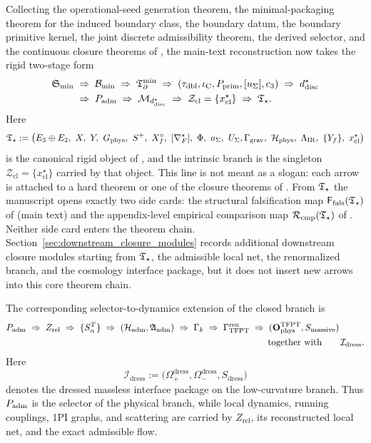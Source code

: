Collecting the operational-seed generation theorem, the minimal-packaging theorem for the induced
boundary class, the boundary datum, the
boundary primitive kernel, the joint discrete admissibility theorem, the derived selector, and the continuous closure
theorems of
, the main-text reconstruction now takes the rigid two-stage form
\begin{equation}
\label{eq:closed-output-chain}
\begin{aligned}
\mathfrak S_{\min}
&\;\Rightarrow\;
\mathcal B_{\min}
\;\Rightarrow\;
\mathfrak T_{\partial}^{\min}
\;\Rightarrow\;
(\tau_{\mathrm{dbl}},\iota_{\mathrm C},P_{\mathrm{prim}},[u_\Sigma],c_3)
\;\Rightarrow\;
d^\star_{\mathrm{disc}}
\\
&\;\Rightarrow\;
P_{\mathrm{adm}}
\;\Rightarrow\;
\mathcal M_{d^\star_{\mathrm{disc}}}
\;\Rightarrow\;
\mathcal Z_{\mathrm{cl}}=\{x^\star_{\mathrm{cl}}\}
\;\Rightarrow\;
\mathfrak T_{\star}.
\end{aligned}
\end{equation}
Here
\[
\Tstar
:=
\bigl(
E_3\oplus E_2,\ X,\ Y,\ G_{\mathrm{phys}},\ S^+,\ X_f^\circ,\ [\nabla_F^\star],\ \Phi,\ a_\Sigma,\ U_\Sigma,\\
\Gamma_{\mathrm{grav}},\ \mathcal H_{\mathrm{phys}},\ \Lambda_{\mathrm{IR}},\ \{Y_f\},\ x_{\mathrm{cl}}^\star
\bigr)
\]
is the canonical rigid object of , and the intrinsic branch is
the singleton $\mathcal Z_{\mathrm{cl}}=\{x_{\mathrm{cl}}^\star\}$ carried by that object.
This line is not meant as a slogan: each arrow is attached to a hard theorem or one of the
closure theorems of . From $\mathfrak T_{\star}$ the manuscript opens exactly two
side cards: the structural falsification map $\mathsf F_{\mathrm{fals}}(\mathfrak T_{\star})$ of
 (main text) and the appendix-level empirical comparison
map $\mathcal R_{\mathrm{cmp}}(\mathfrak T_{\star})$ of . Neither side card enters the
theorem chain.
Section~\ref{sec:downstream_closure_modules} records additional downstream closure modules starting
from $\mathfrak T_{\star}$, the admissible local net, the renormalized branch, and the cosmology interface
package, but it does not insert new arrows into this core theorem chain.

The corresponding selector-to-dynamics extension of the closed branch is
\[
P_{\mathrm{adm}}
\;\Rightarrow\;
Z_{\mathrm{rel}}
\;\Rightarrow\;
\{S_n^T\}
\;\Rightarrow\;
(\mathcal H_{\mathrm{adm}},\mathfrak A_{\mathrm{adm}})
\;\Rightarrow\;
\Gamma_k
\;\Rightarrow\;
\begin{aligned}[t]
\Gamma_{\mathrm{TFPT}}^{\mathrm{ren}}
&\;\Rightarrow\;
(\mathbf O_{\mathrm{phys}}^{\mathrm{TFPT}},S_{\mathrm{massive}})\\
&\qquad\text{together with}\qquad
\mathcal I_{\mathrm{dress}}.
\end{aligned}
\]
Here
\[
\mathcal I_{\mathrm{dress}}
:=
\bigl(\Omega_+^{\mathrm{dress}},\Omega_-^{\mathrm{dress}},S_{\mathrm{dress}}\bigr)
\]
denotes the dressed massless interface package on the low-curvature branch.
Thus $P_{\mathrm{adm}}$ is the selector of the physical branch, while local dynamics, running couplings, 1PI
graphs, and scattering are carried by $Z_{\mathrm{rel}}$, its reconstructed local net, and the
exact admissible flow.

